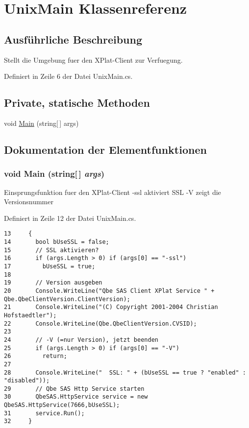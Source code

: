 \hypertarget{classQbeService_1_1UnixMain}{
\section{Unix\-Main Klassenreferenz}
\label{classQbeService_1_1UnixMain}
}


\subsection{Ausf\"{u}hrliche Beschreibung}
Stellt die Umgebung fuer den XPlat-Client zur Verfuegung. 



Definiert in Zeile 6 der Datei Unix\-Main.cs.\subsection*{Private, statische Methoden}
\begin{CompactItemize}
\item 
void \hyperlink{classQbeService_1_1UnixMain_QbeService_1_1UnixMainh0}{Main} (string\mbox{[}$\,$\mbox{]} args)
\end{CompactItemize}


\subsection{Dokumentation der Elementfunktionen}
\hypertarget{classQbeService_1_1UnixMain_QbeService_1_1UnixMainh0}{
\subsubsection[Main]{\setlength{\rightskip}{0pt plus 5cm}void Main (string\mbox{[}$\,$\mbox{]} {\em args})}}
\label{classQbeService_1_1UnixMain_QbeService_1_1UnixMainh0}


Einsprungsfunktion fuer den XPlat-Client -ssl aktiviert SSL -V zeigt die Versionsnummer 

Definiert in Zeile 12 der Datei Unix\-Main.cs.



\footnotesize\begin{verbatim}13     {
14       bool bUseSSL = false;
15       // SSL aktivieren?
16       if (args.Length > 0) if (args[0] == "-ssl")
17         bUseSSL = true;
18 
19       // Version ausgeben
20       Console.WriteLine("Qbe SAS Client XPlat Service " + Qbe.QbeClientVersion.ClientVersion);
21       Console.WriteLine("(C) Copyright 2001-2004 Christian Hofstaedtler");
22       Console.WriteLine(Qbe.QbeClientVersion.CVSID);
23       
24       // -V (=nur Version), jetzt beenden
25       if (args.Length > 0) if (args[0] == "-V")
26         return;
27       
28       Console.WriteLine("  SSL: " + (bUseSSL == true ? "enabled" : "disabled"));
29       // Qbe SAS Http Service starten
30       QbeSAS.HttpService service = new QbeSAS.HttpService(7666,bUseSSL);
31       service.Run();
32     }
\end{verbatim}\normalsize 
